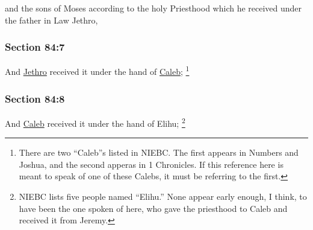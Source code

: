 		\begin{framed}
		\scriptsize
			\begin{compactdesc}
				\item[JSP] and the sons of Moses according to the holy Priesthood which he received under the father in Law Jethro,
			\end{compactdesc}
		\end{framed}

	\subsubsection{Section 84:7} %
		\label{DC84-7}

		And \hyperref[JETHRO]{Jethro} received it under the hand of \hyperref[CALEB]{Caleb};%
			\footnote{%
				There are two ``Caleb''s listed in NIEBC. The first appears in Numbers and Joshua, and the second apperas in 1 Chronicles. If this reference here is meant to speak of one of these Calebs, it must be referring to the first.
				}


	\subsubsection{Section 84:8} %
		\label{DC84-8}

		And \hyperref[CALEB]{Caleb} received it under the hand of Elihu;%
			\footnote{%
				NIEBC lists five people named ``Elihu.'' None appear early enough, I think, to have been the one spoken of here, who gave the priesthood to Caleb and received it from Jeremy.
				}


